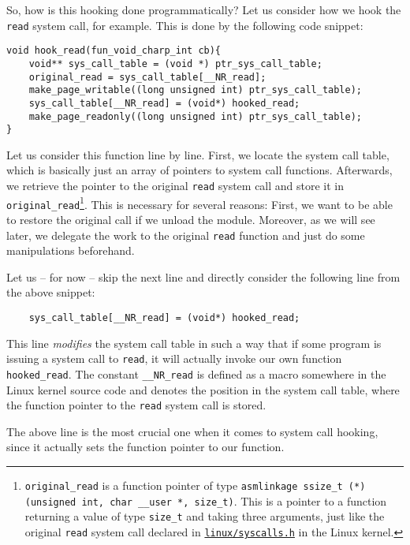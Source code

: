 \documentclass[10pt, letterpaper]{scrartcl}
\begin{document}
So, how is this hooking done programmatically? Let us consider how we hook the \texttt{read} system call, for example. This is done by the following code snippet:

\begin{verbatim}
void hook_read(fun_void_charp_int cb){
    void** sys_call_table = (void *) ptr_sys_call_table;
    original_read = sys_call_table[__NR_read];
    make_page_writable((long unsigned int) ptr_sys_call_table);
    sys_call_table[__NR_read] = (void*) hooked_read;
    make_page_readonly((long unsigned int) ptr_sys_call_table);
}
\end{verbatim}

Let us consider this function line by line. First, we locate the system call table, which is basically just an array of pointers to system call functions. Afterwards, we retrieve the pointer to the original \texttt{read} system call and store it in  \texttt{original\_read}\footnote{\texttt{original\_read} is a function pointer of type \texttt{asmlinkage ssize\_t (*)(unsigned int, char \_\_user *, size\_t)}. This is a pointer to a function returning a value of type \texttt{size\_t} and taking three arguments, just like the original \texttt{read} system call declared in \href{http://lxr.linux.no/linux+v2.6.32/arch/x86/include/asm/syscalls.h}{\texttt{linux/syscalls.h}} in the Linux kernel.}. This is necessary for several reasons: First, we want to be able to restore the original call if we unload the module. Moreover, as we will see later, we delegate the work to the original \texttt{read} function and just do some manipulations beforehand.

Let us -- for now -- skip the next line and directly consider the following line from the above snippet:

\begin{verbatim}
    sys_call_table[__NR_read] = (void*) hooked_read;
\end{verbatim}

This line \emph{modifies} the system call table in such a way that if some program is issuing a system call to \texttt{read}, it will actually invoke our own function \texttt{hooked\_read}. The constant \texttt{\_\_NR\_read} is defined as a macro somewhere in the Linux kernel source code and denotes the position in the system call table, where the function pointer to the \texttt{read} system call is stored.

The above line is the most crucial one when it comes to system call hooking, since it actually sets the function pointer to our function.
\end{document}
